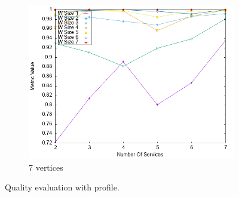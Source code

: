 \begin{figure}[!htb]
\begin{subfigure}{0.33\textwidth}
    \includegraphics[width=\textwidth]{Images/graphs/newwindow_quality_performance_diff_perce_n7_s7_50_89_n7}
    \caption{7 vertices}
    \label{fig:quality_window_average_perce_7n}
  \end{subfigure}
  \caption{ Quality evaluation with \average profile.}
  \label{fig:quality_window_average_perce}
\end{figure}


